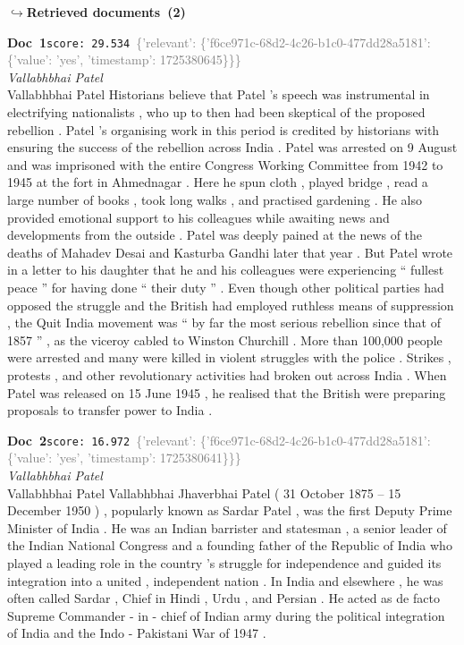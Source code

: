 \documentclass[a4paper,11pt]{article}
\begin{document}
\noindent\hfill{\footnotesize\textcolor{doccolor}{\textbf{$\hookrightarrow$\enspace Retrieved documents~(2)}}}
\begin{docenv}
{\footnotesize\textcolor{doccolor}{\textbf{Doc~1}}}\hfill{\tiny\texttt{score:~29.534}}\ {\tiny\textcolor{gray}{\{'relevant': \{'f6ce971c-68d2-4c26-b1c0-477dd28a5181': \{'value': 'yes', 'timestamp': 1725380645\}\}\}}}\\[3pt]
{\small\textit{Vallabhbhai Patel}}\\[2pt]
\vspace{2pt}
{\footnotesize Vallabhbhai Patel
Historians believe that Patel 's speech was instrumental in electrifying nationalists , who up to then had been skeptical of the proposed rebellion . Patel 's organising work in this period is credited by historians with ensuring the success of the rebellion across India . Patel was arrested on 9 August and was imprisoned with the entire Congress Working Committee from 1942 to 1945 at the fort in Ahmednagar . Here he spun cloth , played bridge , read a large number of books , took long walks , and practised gardening . He also provided emotional support to his colleagues while awaiting news and developments from the outside . Patel was deeply pained at the news of the deaths of Mahadev Desai and Kasturba Gandhi later that year . But Patel wrote in a letter to his daughter that he and his colleagues were experiencing `` fullest peace '' for having done `` their duty '' . Even though other political parties had opposed the struggle and the British had employed ruthless means of suppression , the Quit India movement was `` by far the most serious rebellion since that of 1857 '' , as the viceroy cabled to Winston Churchill . More than 100,000 people were arrested and many were killed in violent struggles with the police . Strikes , protests , and other revolutionary activities had broken out across India . When Patel was released on 15 June 1945 , he realised that the British were preparing proposals to transfer power to India .}
\end{docenv}
\begin{docenv}
{\footnotesize\textcolor{doccolor}{\textbf{Doc~2}}}\hfill{\tiny\texttt{score:~16.972}}\ {\tiny\textcolor{gray}{\{'relevant': \{'f6ce971c-68d2-4c26-b1c0-477dd28a5181': \{'value': 'yes', 'timestamp': 1725380641\}\}\}}}\\[3pt]
{\small\textit{Vallabhbhai Patel}}\\[2pt]
\vspace{2pt}
{\footnotesize Vallabhbhai Patel
Vallabhbhai Jhaverbhai Patel ( 31 October 1875 -- 15 December 1950 ) , popularly known as Sardar Patel , was the first Deputy Prime Minister of India . He was an Indian barrister and statesman , a senior leader of the Indian National Congress and a founding father of the Republic of India who played a leading role in the country 's struggle for independence and guided its integration into a united , independent nation . In India and elsewhere , he was often called Sardar , Chief in Hindi , Urdu , and Persian . He acted as de facto Supreme Commander - in - chief of Indian army during the political integration of India and the Indo - Pakistani War of 1947 .}
\end{docenv}
\end{document}
